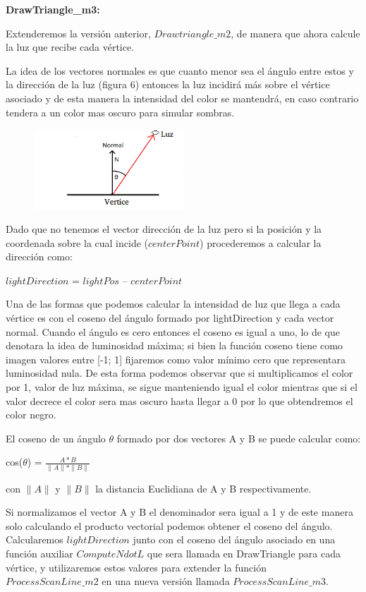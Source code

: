 \documentclass[a4paper]{article}
\newcounter{col}
\begin{document}
\textbf{DrawTriangle\_m3:} 

 	Extenderemos la versión anterior, $Drawtriangle\_m2$, de manera que ahora calcule la luz que recibe cada vértice.
\par La idea de los vectores normales es que cuanto menor sea el ángulo entre estos y la dirección de la luz (figura 6) entonces la luz incidirá más sobre el vértice asociado y de esta manera la intensidad del color se mantendrá, en caso contrario tendera a un color mas oscuro para simular sombras. 
	
	
	\begin{figure}[h]
    \centering
    \includegraphics[width=0.50\textwidth]{Imagenes/f.png}
    \caption{}
    \label{fig:mesh1}
\end{figure}


	Dado que no tenemos el vector dirección de la luz pero si la posición y la coordenada sobre la cual incide ($centerPoint$) procederemos a calcular la dirección como:

 $lightDirection$  = $lightPos$ – $centerPoint$


	Una de las formas que podemos calcular la intensidad de luz que llega a cada vértice es con el coseno del ángulo formado por lightDirection y cada vector normal. Cuando el ángulo es cero entonces el coseno es igual a uno, lo de que denotara la idea de luminosidad máxima; si bien la función coseno tiene como imagen valores entre [-1; 1] fijaremos como valor mínimo cero que representara luminosidad nula. De esta forma podemos observar que si multiplicamos el color por 1, valor de luz máxima, se sigue manteniendo igual el color mientras que si el valor decrece el color sera mas oscuro hasta llegar  a 0 por lo que obtendremos el color negro. 
\par El coseno de un ángulo $\theta$ formado por dos vectores A y B se puede calcular como:

cos($\theta$) = $\frac{A*B}{\parallel A \parallel*\parallel B \parallel}$ 

con $\parallel A \parallel$ y $\parallel B \parallel$ la distancia Euclidiana de A y B respectivamente.

 
Si normalizamos el vector A y B el denominador  sera igual a  1 y de este manera solo calculando el producto vectorial podemos obtener el coseno del ángulo. 
Calcularemos $lightDirection$ junto con el coseno del ángulo asociado en una función auxiliar $ComputeNdotL$ que sera llamada en DrawTriangle para cada vértice, y utilizaremos estos valores para extender la función $ProcessScanLine\_m2$ en una nueva versión llamada $ProcessScanLine\_m3$.
   
\end{document}

